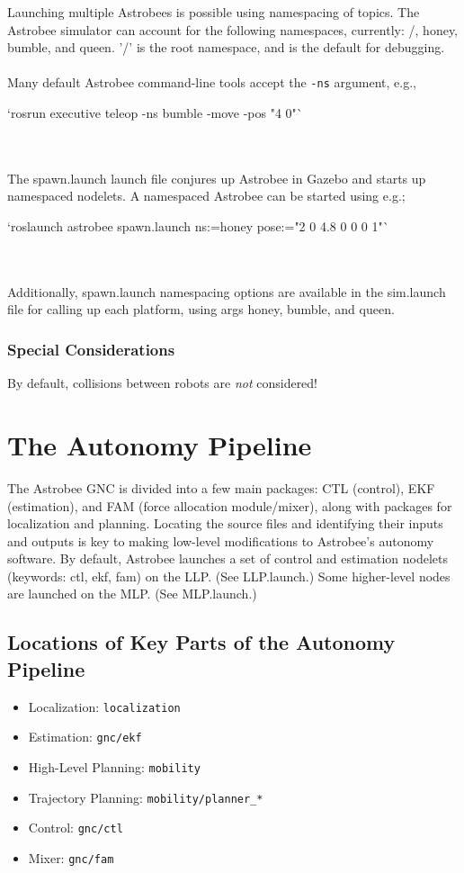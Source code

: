 \documentclass{article}
\begin{document}
Launching multiple Astrobees is possible using namespacing of topics. The Astrobee simulator can account for the following namespaces, currently: /, honey, bumble, and queen. '/' is the root namespace, and is the default for debugging.
\\\\
Many default Astrobee command-line tools accept the \texttt{-ns} argument, e.g.,\\
\begin{markdown}
`rosrun executive teleop -ns bumble -move -pos "4 0"`
\end{markdown}
\\\\
The spawn.launch launch file conjures up Astrobee in Gazebo and starts up namespaced nodelets. A namespaced Astrobee can be started using e.g.;\\
\begin{markdown}
`roslaunch astrobee spawn.launch ns:=honey pose:="2 0 4.8 0 0 0 1"`
\end{markdown}
\\\\
Additionally, spawn.launch namespacing options are available in the sim.launch file for calling up each platform, using args honey, bumble, and queen.

\subsubsection{Special Considerations}

By default, collisions between robots are \textit{not} considered!

\section{The Autonomy Pipeline}

The Astrobee GNC is divided into a few main packages: CTL (control), EKF (estimation), and FAM (force allocation module/mixer), along with packages for localization and planning. Locating the source files and identifying their inputs and outputs is key to making low-level modifications to Astrobee's autonomy software. By default, Astrobee launches a set of control and estimation nodelets (keywords: ctl, ekf, fam) on the LLP. (See LLP.launch.) Some higher-level nodes are launched on the MLP. (See MLP.launch.)

\subsection{Locations of Key Parts of the Autonomy Pipeline}
\begin{itemize}
    \item Localization: \texttt{localization}
    \item Estimation:  \texttt{gnc/ekf}
    \item High-Level Planning: \texttt{mobility}
    \item Trajectory Planning: \texttt{mobility/planner\_*}
    \item Control: \texttt{gnc/ctl}
    \item Mixer: \texttt{gnc/fam}
\end{itemize}
\end{document}
